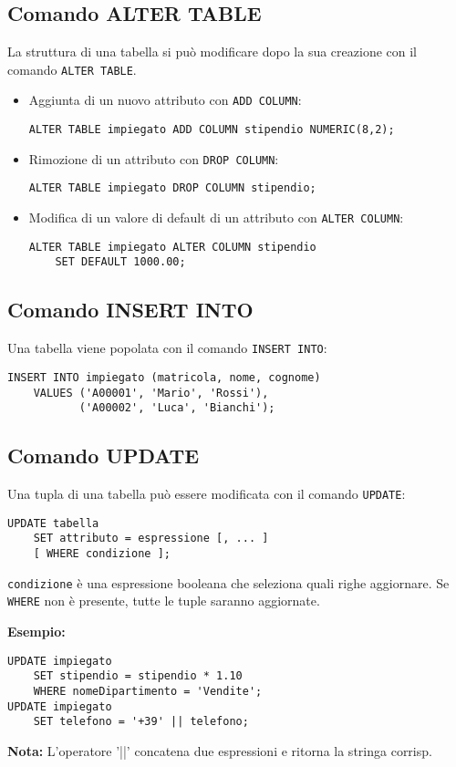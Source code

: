 \documentclass[a4paper, 10pt]{article}
\begin{document}
	\subsection{Comando ALTER TABLE}
		La struttura di una tabella si può modificare dopo la sua creazione con il
		comando \lstinline|ALTER TABLE|.
		\begin{itemize}
			\item Aggiunta di un nuovo attributo con \lstinline|ADD COLUMN|:
			\begin{lstlisting}
ALTER TABLE impiegato ADD COLUMN stipendio NUMERIC(8,2);
			\end{lstlisting}
			\item Rimozione di un attributo con \lstinline|DROP COLUMN|:
			\begin{lstlisting}
ALTER TABLE impiegato DROP COLUMN stipendio;
			\end{lstlisting}
			\item Modifica di un valore di default di un attributo con \lstinline|ALTER COLUMN|:
			\begin{lstlisting}
ALTER TABLE impiegato ALTER COLUMN stipendio
	SET DEFAULT 1000.00;
			\end{lstlisting}			
		\end{itemize}
		
	\subsection{Comando INSERT INTO}
		Una tabella viene popolata con il comando \lstinline|INSERT INTO|:
		\begin{lstlisting}
INSERT INTO impiegato (matricola, nome, cognome)
	VALUES ('A00001', 'Mario', 'Rossi'),
	       ('A00002', 'Luca', 'Bianchi');
		\end{lstlisting}
	
	\subsection{Comando UPDATE}
		Una tupla di una tabella può essere modificata con il comando \lstinline|UPDATE|:
		\begin{lstlisting}
UPDATE tabella
	SET attributo = espressione [, ... ]
	[ WHERE condizione ];
		\end{lstlisting}
	\lstinline|condizione| è una espressione booleana che seleziona quali righe
	aggiornare. Se \lstinline|WHERE| non è presente, tutte le tuple saranno aggiornate.
	
	\textbf{Esempio: }
	\begin{lstlisting}
UPDATE impiegato
	SET stipendio = stipendio * 1.10
	WHERE nomeDipartimento = 'Vendite';
UPDATE impiegato
	SET telefono = '+39' || telefono;
	\end{lstlisting}
	\textbf{Nota:} L’operatore '||' concatena due espressioni e ritorna la stringa corrisp.
	
\end{document}

